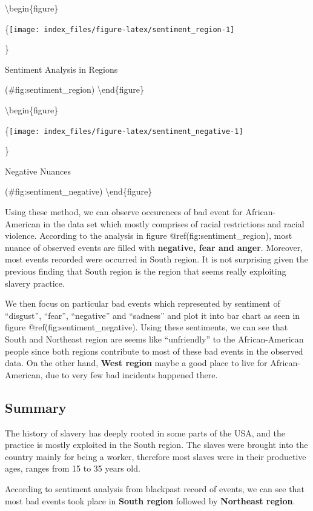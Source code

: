 \documentclass[
]{article}
\begin{document}
\textbackslash begin\{figure\}

\{\centering \texttt{[image: index\_files/figure-latex/sentiment\_region-1]}

\}

\caption{Sentiment Analysis in Regions}

(\#fig:sentiment\_region)
\textbackslash end\{figure\}

\textbackslash begin\{figure\}

\{\centering \texttt{[image: index\_files/figure-latex/sentiment\_negative-1]}

\}

\caption{Negative Nuances}

(\#fig:sentiment\_negative)
\textbackslash end\{figure\}

Using these method, we can observe occurences of bad event for African-American in the data set which mostly comprises of racial restrictions and racial violence. According to the analysis in figure @ref(fig:sentiment\_region), most nuance of observed events are filled with \textbf{negative, fear and anger}. Moreover, most events recorded were occurred in South region. It is not surprising given the previous finding that South region is the region that seems really exploiting slavery practice.

We then focus on particular bad events which represented by sentiment of ``disgust'', ``fear'', ``negative'' and ``sadness'' and plot it into bar chart as seen in figure @ref(fig:sentiment\_negative). Using these sentiments, we can see that South and Northeast region are seems like ``unfriendly'' to the African-American people since both regions contribute to most of these bad events in the observed data. On the other hand, \textbf{West region} maybe a good place to live for African-American, due to very few bad incidents happened there.

\hypertarget{summary}{%
\subsection{Summary}\label{summary}}

The history of slavery has deeply rooted in some parts of the USA, and the practice is mostly exploited in the South region. The slaves were brought into the country mainly for being a worker, therefore most slaves were in their productive ages, ranges from 15 to 35 years old.

According to sentiment analysis from blackpast record of events, we can see that most bad events took place in \textbf{South region} followed by \textbf{Northeast region}.
\end{document}

